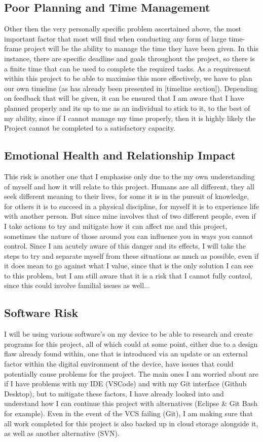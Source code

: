 \documentclass{article}
\begin{document}
\subsection{Poor Planning and Time Management}
Other then the very personally specific problem ascertained above, the most important factor that most will find when conducting any form of large time-frame project will be the ability to manage the time they have been given. In this instance, there are specific deadline and goals throughout the project, so there is a finite time that can be used to complete the required tasks. As a requirement within this project to be able to maximise this more effectively, we have to plan our own timeline (as has already been presented in [timeline section]). Depending on feedback that will be given, it can be ensured that I am aware that I have planned properly and its up to me as an individual to stick to it, to the best of my ability, since if I cannot manage my time properly, then it is highly likely the Project cannot be completed to a satisfactory capacity.

\subsection{Emotional Health and Relationship Impact}
This risk is another one that I emphasise only due to the my own understanding of myself and how it will relate to this project. Humans are all different, they all seek different meaning to their lives, for some it is in the pursuit of knowledge, for others it is to succeed in a physical discipline, for myself it is to experience life with another person. But since mine involves that of two different people, even if I take actions to try and mitigate how it can affect me and this project, sometimes the nature of those around you can influence you in ways you cannot control. Since I am acutely aware of this danger and its effects, I will take the steps to try and separate myself from these situations as much as possible, even if it does mean to go against what I value, since that is the only solution I can see to this problem, but I am still aware that it is a risk that I cannot fully control, since this could involve familial issues as well...

\subsection{Software Risk}
I will be using various software's on my device to be able to research and create programs for this project, all of which could at some point, either due to a design flaw already found within, one that is introduced via an update or an external factor within the digital environment of the device, have issues that could potentially cause problems for the project. The main ones I am worried about are if I have problems with my IDE (VSCode) and with my Git interface (Github Desktop), but to mitigate these factors, I have already looked into and understand how I can continue this project with alternatives (Eclipse \& Git Bash for example). Even in the event of the VCS failing (Git), I am making sure that all work completed for this project is also backed up in cloud storage alongside it, as well as another alternative (SVN).
\end{document}
